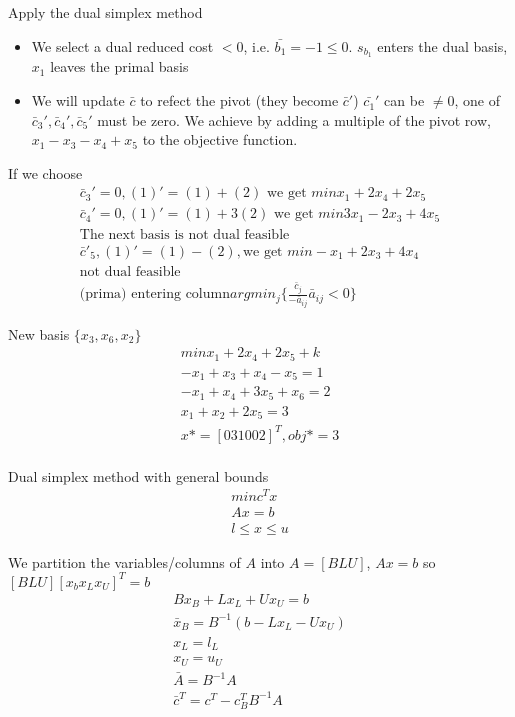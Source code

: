 \documentclass{article}
\theoremstyle{plain}
\theoremstyle{definition}
\begin{document}
Apply the dual simplex method
\begin{itemize}
    \item We select a dual reduced cost $<0$, i.e. $\bar{b_1} = -1 \leq 0$.
        $s_{b_1}$ enters the dual basis, $x_1$ leaves the primal basis
    \item We will update $\bar{c}$ to refect the pivot (they become $\bar{c}'$)
        $\bar{c_1}'$ can be $\ne 0$, one of $\bar{c}_3', \bar{c}_4', \bar{c}_5'$ must
        be zero. We achieve by adding a multiple of the pivot row,
        $x_1 - x_3- x_4 + x_5$ to the objective function.
\end{itemize}

If we choose
\begin{align*}
    \bar{c}_3' = 0, (1)' = (1) + (2) \text{ we get $min x_1 + 2x_4 + 2x_5$}\\
    \bar{c}_4' = 0, (1)' = (1) + 3(2) \text{ we get $min 3x_1 - 2x_3 + 4x_5$}\\
    \text{The next basis is not dual feasible}\\
    \bar{c}'_5, (1)' = (1) - (2),\text{we get $min -x_1 + 2x_3 + 4x_4$}\\
    \text{not dual feasible}\\
    \text{(prima) entering column} argmin_j \{\frac{\bar{c}_j}{-\bar{a}_{ij}}
    \bar{a}_{ij} < 0\}
\end{align*}


New basis $\{x_3, x_6, x_2\}$
\begin{align*}
    min x_1  + 2x_4 + 2x_5 + k\\
    -x_1 + x_3 + x_4 - x_5 = 1\\
    -x_1 + x_4 + 3x_5 + x_6 = 2\\
    x_1 + x_2 + 2x_5 = 3\\
    x* = [ 0 3 1 0 0 2]^T, obj* = 3\\
\end{align*}

Dual simplex method with general bounds
\begin{align*}
    min c^Tx\\
    Ax = b\\
    l \leq x \leq u
\end{align*}

We partition the variables/columns of $A$ into $A = [ B L U ]$,
$Ax =b$ so $[ B L U] [ x_b x_L x_U]^T = b$
\begin{align*}
    Bx_B + Lx_L + Ux_U = b\\
    \bar{x}_B = B^{-1}(b-Lx_L - Ux_U)\\
    x_L = l_L\\
    x_U = u_U\\
    \bar{A} = B^{-1}A\\
    \bar{c}^T = c^T - c_B^TB^{-1}A
\end{align*}
\end{document}
